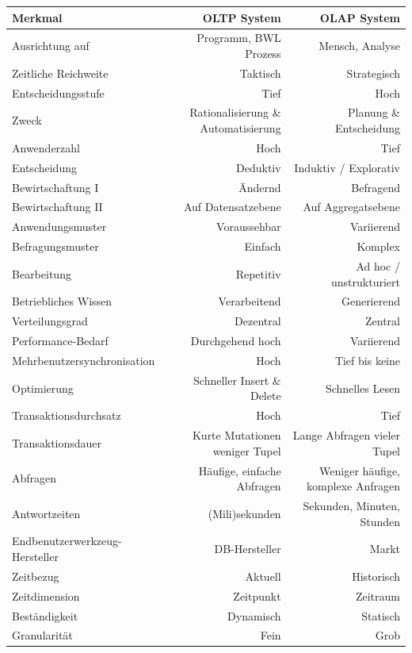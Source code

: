 \documentclass[a4paper, 11pt]{article}
\begin{document}
\begin{tabular}{|l|r|r|}
	\hline 
	Merkmal & OLTP System  & OLAP System  \\ 
	\hline 
	Ausrichtung auf & Programm, BWL Prozess & Mensch, Analyse\\ 
	\hline 
	Zeitliche Reichweite & Taktisch & Strategisch \\ 
	\hline 
	Entscheidungsstufe & Tief & Hoch \\ 
	\hline
	Zweck & Rationalisierung \& Automatisierung & Planung \& Entscheidung \\
	\hline
	Anwenderzahl &Hoch & Tief \\
	\hline
	Entscheidung & Deduktiv & Induktiv / Explorativ \\
	\hline
	Bewirtschaftung I & Ändernd & Befragend \\
	\hline
	Bewirtschaftung II & Auf Datensatzebene & Auf Aggregatsebene \\
	\hline
	Anwendungsmuster & Voraussehbar & Variierend \\
	\hline
	Befragungsmuster & Einfach & Komplex \\
	\hline
	Bearbeitung & Repetitiv & Ad hoc / unstrukturiert \\
	\hline
	Betriebliches Wissen & Verarbeitend & Generierend \\
	\hline
	Verteilungsgrad & Dezentral & Zentral \\
	\hline
	Performance-Bedarf & Durchgehend hoch & Variierend \\
	\hline
	Mehrbenutzersynchronisation & Hoch & Tief bis keine \\
	\hline
	Optimierung & Schneller Insert \& Delete & Schnelles Lesen \\
	\hline
	Transaktionsdurchsatz & Hoch & Tief \\
	\hline
	Transaktionsdauer & Kurte Mutationen weniger Tupel & Lange Abfragen vieler Tupel \\
	\hline
	Abfragen & Häufige, einfache Abfragen & Weniger häufige, komplexe Anfragen \\
	\hline
	Antwortzeiten & (Mili)sekunden & Sekunden, Minuten, Stunden \\
	\hline
	Endbenutzerwerkzeug-Hersteller & DB-Hersteller & Markt \\
	\hline
	Zeitbezug & Aktuell & Historisch \\ 
	\hline
	Zeitdimension & Zeitpunkt & Zeitraum \\
	\hline
	Beständigkeit & Dynamisch & Statisch \\
	\hline
	Granularität & Fein & Grob \\

\end{tabular}
\end{document}

